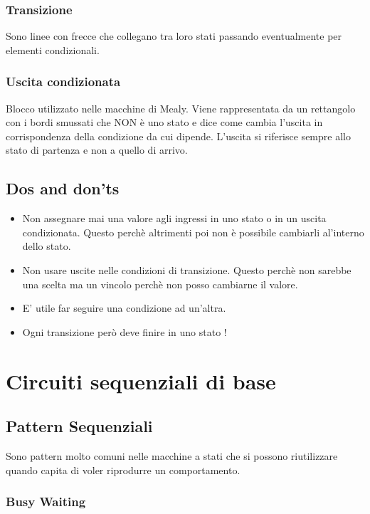 \documentclass[a4paper]{book}
\begin{document}
\subsection*{Transizione}

Sono linee con frecce che collegano tra loro stati passando eventualmente per elementi condizionali.

\subsection*{Uscita condizionata}

Blocco utilizzato nelle macchine di Mealy.
Viene rappresentata da un rettangolo con i bordi smussati che NON è uno stato e dice come cambia l'uscita in corrispondenza della  condizione da cui dipende.
L'uscita si riferisce sempre allo stato di partenza e non a quello di arrivo.
\section{Dos and don'ts}

\begin{itemize}
\item Non assegnare mai una valore agli ingressi in uno stato o in un uscita condizionata. Questo perchè altrimenti poi non è possibile cambiarli al'interno dello stato.
\item Non usare uscite nelle condizioni di transizione. Questo perchè non sarebbe una scelta ma un vincolo perchè non posso cambiarne il valore.
\item E' utile far seguire una condizione ad un'altra.
\item Ogni transizione però deve finire in uno stato !
\end{itemize}


\chapter{Circuiti sequenziali di base}

\section{Pattern Sequenziali}

Sono pattern molto comuni nelle macchine a stati che si possono riutilizzare quando capita di voler riprodurre un comportamento.

\subsection*{Busy Waiting}
\end{document}

